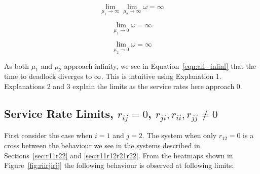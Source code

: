 \documentclass{article}
\begin{document}
\begin{equation}\label{eqn:all_infinf}
\lim_{\mu_1 \to \infty} \lim_{\mu_2 \to \infty} \omega = \infty
\end{equation}

\begin{equation}\label{eqn:all_0_}
\lim_{\mu_1 \to 0} \omega = \infty
\end{equation}

\begin{equation}\label{eqn:all__0}
\lim_{\mu_2 \to 0} \omega = \infty
\end{equation}

As both $\mu_1$ and $\mu_2$ approach infinity, we see in Equation~\ref{eqn:all_infinf} that the time to deadlock diverges to $\infty$. This is intuitive using Explanation 1. Explanations 2 and 3 explain the limits as the service rates here approach $0$.


\subsection{Service Rate Limits, $r_{ij} = 0$, $r_{ji}, r_{ii}, r_{jj} \neq 0$}\label{sec:riirjirjj}

First consider the case when $i = 1$ and $j = 2$.
The system when only $r_{12} = 0$ is a cross between the behaviour we see in the systems described in Sections~\ref{sec:r11r22} and \ref{sec:r11r12r21r22}. From the heatmaps shown in Figure~\ref{fig:riirjirjj} the following behaviour is observed at following limits:
\end{document}

